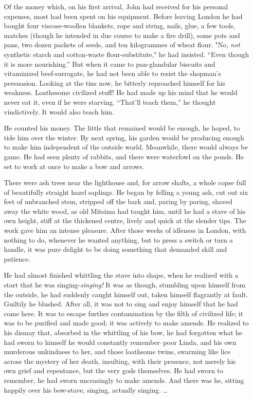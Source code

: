 \documentclass[12pt]{report}
\begin{document}
Of the money which, on his first arrival, John had received for his
personal expenses, most had been spent on his equipment. Before leaving
London he had bought four viscose-woollen blankets, rope and string,
nails, glue, a few tools, matches (though he intended in due course to
make a fire drill), some pots and pans, two dozen packets of seeds, and
ten kilogrammes of wheat flour. "No, \emph{not} synthetic starch and
cotton-waste flour-substitute," he had insisted. ``Even though it is
more nourishing.'' But when it came to pan-glandular biscuits and
vitaminized beef-surrogate, he had not been able to resist the shopman's
persuasion. Looking at the tins now, he bitterly reproached himself for
his weakness. Loathesome civilized stuff! He had made up his mind that
he would never eat it, even if he were starving. ``That'll teach them,''
he thought vindictively. It would also teach him.

He counted his money. The little that remained would be enough, he
hoped, to tide him over the winter. By next spring, his garden would be
producing enough to make him independent of the outside world.
Meanwhile, there would always be game. He had seen plenty of rabbits,
and there were waterfowl on the ponds. He set to work at once to make a
bow and arrows.

There were ash trees near the lighthouse and, for arrow shafts, a whole
copse full of beautifully straight hazel saplings. He began by felling a
young ash, cut out six feet of unbranched stem, stripped off the bark
and, paring by paring, shaved away the white wood, as old Mitsima had
taught him, until he had a stave of his own height, stiff at the
thickened centre, lively and quick at the slender tips. The work gave
him an intense pleasure. After those weeks of idleness in London, with
nothing to do, whenever he wanted anything, but to press a switch or
turn a handle, it was pure delight to be doing something that demanded
skill and patience.

He had almost finished whittling the stave into shape, when he realized
with a start that he was singing-\emph{singing!} It was as though,
stumbling upon himself from the outside, he had suddenly caught himself
out, taken himself flagrantly at fault. Guiltily he blushed. After all,
it was not to sing and enjoy himself that he had come here. It was to
escape further contamination by the filth of civilized life; it was to
be purified and made good; it was actively to make amends. He realized
to his dismay that, absorbed in the whittling of his bow, he had
forgotten what he had sworn to himself he would constantly
remember--poor Linda, and his own murderous unkindness to her, and those
loathsome twins, swarming like lice across the mystery of her death,
insulting, with their presence, not merely his own grief and repentance,
but the very gods themselves. He had sworn to remember, he had sworn
unceasingly to make amends. And there was he, sitting happily over his
bow-stave, singing, actually singing. \ldots{}
\end{document}
